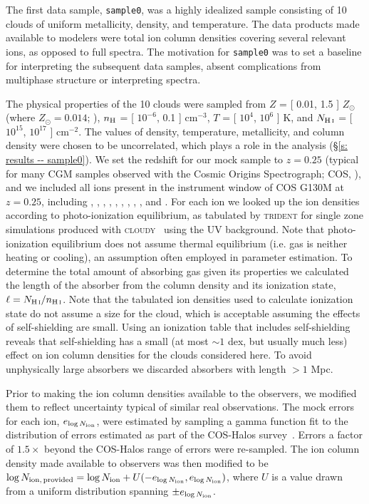 \documentclass[fleqn,usenatbib]{mnras}
\begin{document}
The first data sample, \texttt{sample0}, was a highly idealized sample consisting of 10 clouds of uniform metallicity, density, and temperature.
The data products made available to modelers were total ion column densities covering several relevant ions, as opposed to full spectra.
The motivation for \texttt{sample0} was to set a baseline for interpreting the subsequent data samples, absent complications from multiphase structure or interpreting spectra.

The physical properties of the 10 clouds were sampled from $Z$ = [ 0.01, 1.5 ] $Z_\odot$ (where $Z_\odot = 0.014$; \citealt{Asplund2009}), $n_{\rm H}$ = [ $10^{-6}$, 0.1 ] cm$^{-3}$, $T$ = [ $10^4$, $10^6$ ] K, and $N_{\ion{H}{I}}$ = [ $10^{15}$, $10^{17}$ ] cm$^{-2}$.
The values of density, temperature, metallicity, and  column density were chosen to be uncorrelated, which plays a role in the analysis (\S\ref{s: results -- sample0}).
We set the redshift for our mock sample to $z=0.25$ (typical for many CGM samples observed with the Cosmic Origins Spectrograph; COS, \citealt{Green2012}), and we included all ions present in the instrument window of COS G130M at $z=0.25$, including , , , , , , ,  , , and .
For each ion we looked up the ion densities according to photo-ionization equilibrium, as tabulated by \textsc{trident} for single zone simulations produced with \textsc{cloudy}~\citep{Ferland2013} using the \cite{Haardt2012} UV background.
Note that photo-ionization equilibrium does not assume thermal equilibrium (i.e. gas is neither heating or cooling),
an assumption often employed in parameter estimation.
To determine the total amount of absorbing gas given its properties we calculated the length of the absorber from the  column density and its ionization state, $\ell = N_{\ion{H}{I}} / n_{\ion{H}{I}}$.
Note that the tabulated ion densities used to calculate ionization state do not assume a size for the cloud, which is acceptable assuming the effects of self-shielding are small.
Using an ionization table that includes self-shielding reveals that self-shielding has a small (at most $\sim 1$ dex, but usually much less) effect on ion column densities for the clouds considered here.
To avoid unphysically large absorbers we discarded absorbers with length $> 1$ Mpc.

Prior to making the ion column densities available to the observers, we modified them to reflect uncertainty typical of similar real observations.
The mock errors for each ion, $e_{\log N_{\rm ion}}$, were estimated by sampling a gamma function fit to the distribution of errors estimated as part of the COS-Halos survey~\citep{Werk2013}.
Errors a factor of $1.5\times$ beyond the COS-Halos range of errors were re-sampled.
The ion column density made available to observers was then modified to be $\log N_{\rm ion,\,provided} = \log N_{\rm ion} + U(-e_{\log N_{\rm ion}}, e_{\log N_{\rm ion}} )$, where $U$ is a value drawn from a uniform distribution spanning $\pm e_{\log N_{\rm ion}}$.
\end{document}
